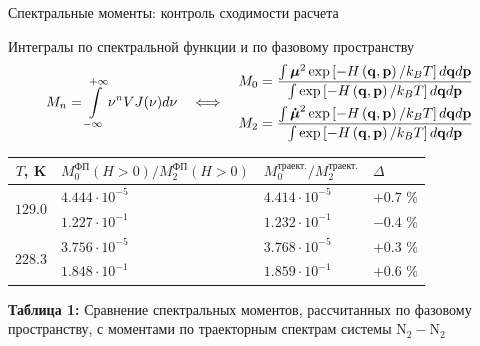 \documentclass[10pt,usenames,pdf,hyperref={unicode},dvipsnames]{beamer}
\newcommand{\lb}{\left(}
\newcommand{\rb}{\right)}
\newcommand{\lsq}{\left[}
\newcommand{\rsq}{\right]}
\newcommand{\mf}{\mathbf}
\newcommand{\mycaption}[2]{
    \textbf{#1:} #2
}
\begin{document}
\begin{frame}{\hspace*{-0.3cm}Спектральные моменты: контроль сходимости расчета}
    \vspace*{-0.3cm}
    \begin{block}{{\normalsize Интегралы по спектральной функции и по фазовому пространству}}
        \vspace*{-0.6cm}
        \begin{gather}
            M_n = \int\limits_{-\infty}^{+\infty} \nu^n VJ(\nu) d\nu \quad \Longleftrightarrow \quad 
            \begin{aligned}
                M_0 = \frac{\int \boldsymbol{\mu}^2 \exp \lsq -H \lb \mf{q}, \mf{p} \rb / k_B T \rsq d \mf{q} d\mf{p} }{\int \exp \lsq -H \lb \mf{q}, \mf{p}\rb / k_B T \rsq d \mf{q} d\mf{p} } \\
                M_2 = \frac{\int \boldsymbol{\dot{\mu}}^2 \exp \lsq -H \lb \mf{q}, \mf{p}\rb / k_B T \rsq d \mf{q} d\mf{p}}{\int \exp \lsq -H \lb \mf{q}, \mf{p} \rb / k_B T \rsq d \mf{q} d\mf{p} } 
            \end{aligned} \notag
        \end{gather}
    \end{block}

    \vspace*{-0.7cm}
    \begin{table}[H]
            \begin{tabular}{c >{\centering}p{5cm} >{\centering}p{2cm} >{\centering}p{2cm}}
            \toprule
            $T$, K & $M_0^\text{ФП}(H > 0) / M_2^\text{ФП} (H > 0)$  & $M_0^\text{траект.} / M_2^\text{траект.}$ & $\Delta$ \tabularnewline
            \midrule
            \multirow{2}{*}{$129.0$} & $4.444\cdot 10^{-5}$ & $4.414 \cdot 10^{-5}$ & $+0.7$ \%  \tabularnewline
                                     & $1.227\cdot 10^{-1}$ & $1.232 \cdot 10^{-1}$ & $-0.4$ \%  \tabularnewline
                                     \midrule
            \multirow{2}{*}{$228.3$} & $3.756\cdot 10^{-5}$ & $3.768 \cdot 10^{-5}$ & $+0.3$ \%  \tabularnewline
                                     & $1.848\cdot 10^{-1}$ & $1.859 \cdot 10^{-1}$ & $+0.6$ \%  \tabularnewline
                                     \midrule
        \end{tabular}
        \mycaption{Таблица 1}{Сравнение спектральных моментов, рассчитанных по фазовому пространству, с моментами по траекторным спектрам системы N$_2-$N$_2$}
        \label{table:n2n2-moments}
    \end{table}
\end{frame}
\end{document}
